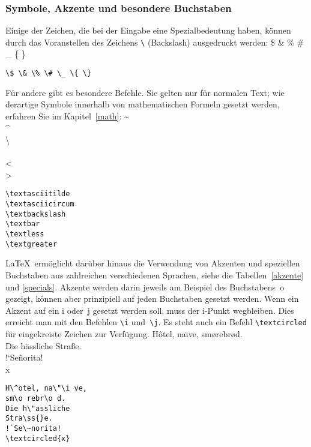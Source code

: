 \subsubsection{Symbole, Akzente und besondere Buchstaben}\label{symbole}

Einige der Zeichen, die bei der Eingabe eine Spezialbedeutung haben,
können durch das Voranstellen des
Zeichens \verb|\| (Backslash) ausgedruckt werden:
\exa
\$ \& \% \# \_ \{ \}
\exb
\begin{verbatim}
\$ \& \% \# \_ \{ \}
\end{verbatim}
\exc
Für andere gibt es besondere Befehle.  Sie gelten nur für normalen
Text; wie derartige Symbole innerhalb von mathematischen
Formeln gesetzt werden, erfahren Sie im Kapitel~\ref{math}:
\exa
\textasciitilde \\
\textasciicircum \\
\textbackslash \\
\textbar \\ 
\textless\\
\textgreater
\exb
\begin{verbatim}
\textasciitilde
\textasciicircum
\textbackslash 
\textbar  
\textless  
\textgreater
\end{verbatim}
\exc

\LaTeX\ ermöglicht darüber hinaus die Verwendung von Akzenten 
und speziellen Buchstaben aus zahlreichen verschiedenen Sprachen, 
siehe die Tabellen~\ref{akzente}  und \ref{specials}.
Akzente werden darin jeweils am Beispiel
des Buchstabens~o gezeigt, können aber prinzipiell auf jeden
Buchstaben gesetzt werden.
Wenn ein Akzent auf ein i oder~j gesetzt werden soll, muss der
\mbox{i-Punkt} wegbleiben. Dies erreicht man mit den Befehlen
\verb|\i| und~\verb|\j|.
Es steht auch ein Befehl \verb|\textcircled| für 
eingekreiste Zeichen zur Verfügung.
\exa
Hôtel, na\"\i ve, smørebrød.\\[1\baselineskip]
Die hässliche Straße.\\[1\baselineskip]
!`Señorita!\\
\textcircled{x}
\exb
\begin{verbatim}
H\^otel, na\"\i ve,
sm\o rebr\o d.
Die h\"assliche
Stra\ss{}e.
!`Se\~norita!
\textcircled{x}
\end{verbatim}
\exc

